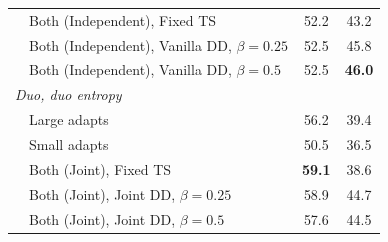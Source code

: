 \begin{table}[t]
\begin{tabular}{llcc}
        & Both (Independent), Fixed TS & 52.2 & 43.2 \\
        & Both (Independent), Vanilla DD, $\beta = 0.25$ & 52.5 & 45.8 \\
        & Both (Independent), Vanilla DD, $\beta = 0.5$ & 52.5 & \textbf{46.0} \\
        \midrule
        \multicolumn{4}{l}{\textit{Duo, duo entropy}} \\
        & Large adapts & 56.2 & 39.4 \\
        & Small adapts & 50.5 & 36.5 \\
        & Both (Joint), Fixed TS & \textbf{59.1} & 38.6 \\
        & Both (Joint), Joint DD, $\beta = 0.25$ & 58.9 & 44.7 \\
        & Both (Joint), Joint DD, $\beta = 0.5$ & 57.6 & 44.5 \\
        \bottomrule
    \end{tabular}
\end{table}

